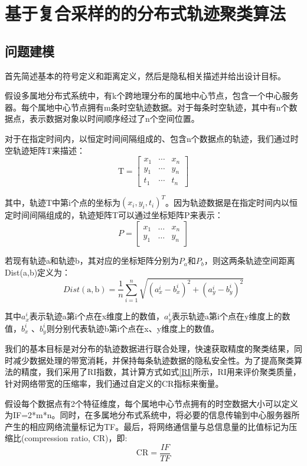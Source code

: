 \section{基于复合采样的的分布式轨迹聚类算法}

\subsection{问题建模}
首先简述基本的符号定义和距离定义，然后是隐私相关描述并给出设计目标。

假设多属地分布式系统中，有k个跨地理分布的属地中心节点，包含一个中心服务器。每个属地中心节点拥有m条时空轨迹数据。对于每条时空轨迹，其中有n个数据点，表示数据对象以时间顺序经过了n个空间位置。

对于在指定时间内，以恒定时间间隔组成的、包含n个数据点的轨迹，我们通过时空轨迹矩阵T来描述：
\[
\mathrm{T}=\left[\begin{array}{lll}
{x_{1}} & {\cdots} & {x_{n}} \\
{y_{1}} & {\cdots} & {y_{n}} \\
{t_{1}} & {\cdots} & {t_{n}}
\end{array}\right]
\]

其中，轨迹T中第i个点的坐标为$(x_i,y_i,t_i)^T$。因为轨迹数据是在指定时间内以恒定时间间隔组成的，轨迹矩阵T可以通过坐标矩阵P来表示：
\[
P=\left[\begin{array}{lll}
{x_{1}} & {\dots} & {x_{n}} \\
{y_{1}} & {\dots} & {y_{n}}
\end{array}\right]
\]

若现有轨迹a和轨迹b，其对应的坐标矩阵分别为$P_a$和$P_b$，则这两条轨迹空间距离Dist(a,b)定义为：
\begin{equation}
\label{ch3dist}
Dist(\mathrm{a}, \mathrm{b})=\frac{1}{n} \sum_{i=1}^{n} \sqrt{\left(a_{x}^{i}-b_{x}^{i}\right)^{2}+\left(a_{y}^{i}-b_{y}^{i}\right)^{2}}
\end{equation}

其中$a_x^i$表示轨迹a第i个点在x维度上的数值，$a_y^i$表示轨迹a第i个点在y维度上的数值，$b_x^i$ 、$b_y^i$则分别代表轨迹b第i个点在x、y维度上的数值。	

我们的基本目标是对分布的轨迹数据进行联合处理，快速获取精度的聚类结果，同时减少数据处理的带宽消耗，并保持每条轨迹数据的隐私安全性。为了提高聚类算法的精度，我们采用了RI指数，其计算方式如式\ref{RI}所示，RI用来评价聚类质量，针对网络带宽的压缩率，我们通过自定义的CR指标来衡量。

假设每个数据点有2个特征维度，每个属地中心节点拥有的时空数据大小可以定义为IF=2*m*n。同时，在多属地分布式系统中，将必要的信息传输到中心服务器所产生的相应网络流量标记为TF。最后，将网络通信量与总信息量的比值标记为压缩比(compression ratio, CR)，即:
\begin{equation}
\label{CR}
\mathrm{CR}=\frac{I F}{T F}
\end{equation}

